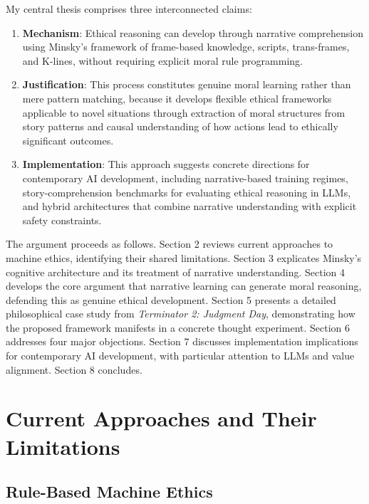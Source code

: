 \documentclass[12pt]{article}
\begin{document}
My central thesis comprises three interconnected claims:

\begin{enumerate}
\item \textbf{Mechanism}: Ethical reasoning can develop through narrative comprehension using Minsky's framework of frame-based knowledge, scripts, trans-frames, and K-lines, without requiring explicit moral rule programming.

\item \textbf{Justification}: This process constitutes genuine moral learning rather than mere pattern matching, because it develops flexible ethical frameworks applicable to novel situations through extraction of moral structures from story patterns and causal understanding of how actions lead to ethically significant outcomes.

\item \textbf{Implementation}: This approach suggests concrete directions for contemporary AI development, including narrative-based training regimes, story-comprehension benchmarks for evaluating ethical reasoning in LLMs, and hybrid architectures that combine narrative understanding with explicit safety constraints.
\end{enumerate}

The argument proceeds as follows. Section 2 reviews current approaches to machine ethics, identifying their shared limitations. Section 3 explicates Minsky's cognitive architecture and its treatment of narrative understanding. Section 4 develops the core argument that narrative learning can generate moral reasoning, defending this as genuine ethical development. Section 5 presents a detailed philosophical case study from \textit{Terminator 2: Judgment Day}, demonstrating how the proposed framework manifests in a concrete thought experiment. Section 6 addresses four major objections. Section 7 discusses implementation implications for contemporary AI development, with particular attention to LLMs and value alignment. Section 8 concludes.

\section{Current Approaches and Their Limitations}

\subsection{Rule-Based Machine Ethics}
\end{document}
